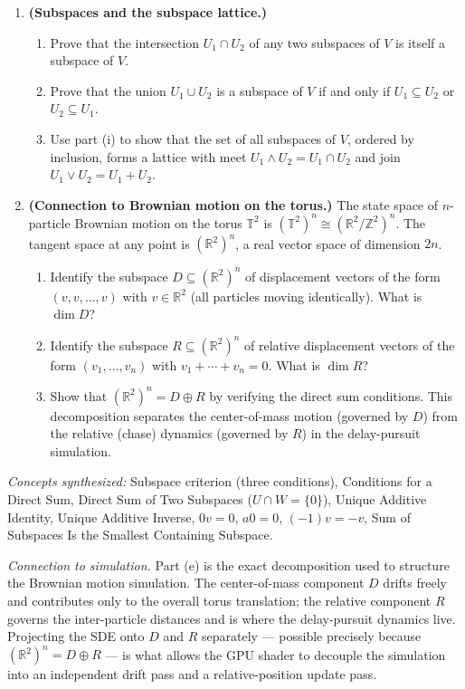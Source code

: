 \begin{remark*}
\begin{enumerate}[label=(\alph*)]
\item \textbf{(Subspaces and the subspace lattice.)}
\begin{enumerate}[label=(\roman*)]
  \item Prove that the intersection $U_1 \cap U_2$ of any two subspaces of $V$
        is itself a subspace of $V$.
  \item Prove that the union $U_1 \cup U_2$ is a subspace of $V$ if and only if
        $U_1 \subseteq U_2$ or $U_2 \subseteq U_1$.
  \item Use part (i) to show that the set of all subspaces of $V$, ordered by
        inclusion, forms a lattice with meet $U_1 \wedge U_2 = U_1 \cap U_2$
        and join $U_1 \vee U_2 = U_1 + U_2$.
\end{enumerate}

\item \textbf{(Connection to Brownian motion on the torus.)}
The state space of $n$-particle Brownian motion on the torus $\mathbb{T}^2$
is $(\mathbb{T}^2)^n \cong (\mathbb{R}^2/\mathbb{Z}^2)^n$. The tangent
space at any point is $(\mathbb{R}^2)^n$, a real vector space of dimension $2n$.
\begin{enumerate}[label=(\roman*)]
  \item Identify the subspace $D \subseteq (\mathbb{R}^2)^n$ of displacement
        vectors of the form $(v, v, \ldots, v)$ with $v \in \mathbb{R}^2$
        (all particles moving identically). What is $\dim D$?
  \item Identify the subspace $R \subseteq (\mathbb{R}^2)^n$ of relative
        displacement vectors of the form $(v_1, \ldots, v_n)$ with
        $v_1 + \cdots + v_n = 0$. What is $\dim R$?
  \item Show that $(\mathbb{R}^2)^n = D \oplus R$ by verifying the direct sum
        conditions. This decomposition separates the center-of-mass motion
        (governed by $D$) from the relative (chase) dynamics (governed by $R$)
        in the delay-pursuit simulation.
\end{enumerate}

\end{enumerate}

\medskip
\textit{Concepts synthesized:}
Subspace criterion (three conditions),
Conditions for a Direct Sum,
Direct Sum of Two Subspaces ($U \cap W = \{0\}$),
Unique Additive Identity,
Unique Additive Inverse,
$0v = 0$, $a0 = 0$, $(-1)v = -v$,
Sum of Subspaces Is the Smallest Containing Subspace.

\medskip
\textit{Connection to simulation.}
Part (e) is the exact decomposition used to structure the Brownian motion
simulation. The center-of-mass component $D$ drifts freely and contributes
only to the overall torus translation; the relative component $R$ governs
the inter-particle distances and is where the delay-pursuit dynamics live.
Projecting the SDE onto $D$ and $R$ separately — possible precisely because
$(\mathbb{R}^2)^n = D \oplus R$ — is what allows the GPU shader to decouple
the simulation into an independent drift pass and a relative-position update
pass.
\end{remark*}

